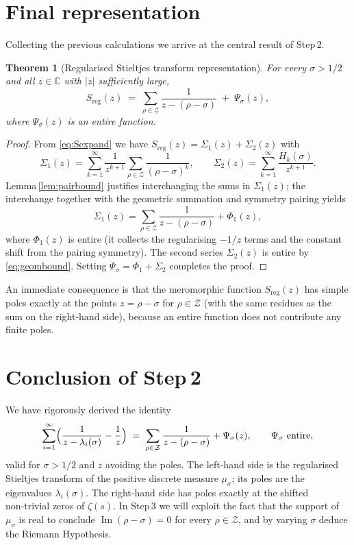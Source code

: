\documentclass[11pt,a4paper]{article}
\newtheorem{theorem}{Theorem}[section]
\theoremstyle{definition}
\newcommand{\C}{\mathbb{C}}
\newcommand{\Z}{\mathcal{Z}}
\newcommand{\IM}{\operatorname{Im}}
\begin{document}
\section{Final representation}
Collecting the previous calculations we arrive at the central result
of Step 2.

\begin{theorem}[Regularised Stieltjes transform representation]\label{thm:main}
For every \(\sigma > 1/2\) and all \(z \in \C\) with \(|z|\) sufficiently
large,
\[
S_{\mathrm{reg}}(z) \;=\; \sum_{\rho \in \Z} \frac{1}{z - (\rho-\sigma)}
\;+\; \Psi_\sigma(z),
\]
where \(\Psi_\sigma(z)\) is an entire function.
\end{theorem}

\begin{proof}
From \eqref{eq:Sexpand} we have
\(S_{\mathrm{reg}}(z) = \Sigma_1(z) + \Sigma_2(z)\) with
\[
\Sigma_1(z) = \sum_{k=1}^\infty \frac{1}{z^{k+1}}
\sum_{\rho \in \Z} \frac{1}{(\rho-\sigma)^k},
\qquad
\Sigma_2(z) = \sum_{k=1}^\infty \frac{H_k(\sigma)}{z^{k+1}} .
\]
Lemma \ref{lem:pairbound} justifies interchanging the sums in
\(\Sigma_1(z)\); the interchange together with the geometric summation
and symmetry pairing yields
\[
\Sigma_1(z) = \sum_{\rho \in \Z} \frac{1}{z-(\rho-\sigma)}
+ \Phi_1(z),
\]
where \(\Phi_1(z)\) is entire (it collects the regularising
\(-1/z\) terms and the constant shift from the pairing symmetry).
The second series \(\Sigma_2(z)\) is entire by
\eqref{eq:geombound}.  Setting \(\Psi_\sigma = \Phi_1 + \Sigma_2\)
completes the proof.
\end{proof}

An immediate consequence is that the meromorphic function
\(S_{\mathrm{reg}}(z)\) has simple poles exactly at the points
\(z = \rho-\sigma\) for \(\rho \in \Z\) (with the same residues as
the sum on the right‑hand side), because an entire function does not
contribute any finite poles.

\section*{Conclusion of Step 2}
We have rigorously derived the identity
\[
\sum_{i=1}^\infty \Bigl( \frac{1}{z - \lambda_i(\sigma)} - \frac{1}{z} \Bigr)
\;=\; \sum_{\rho \in \Z} \frac{1}{z - (\rho-\sigma)} + \Psi_\sigma(z),
\qquad \Psi_\sigma \text{ entire},
\]
valid for \(\sigma > 1/2\) and \(z\) avoiding the poles.
The left‑hand side is the regularised Stieltjes transform of the
positive discrete measure \(\mu_\sigma\); its poles are the eigenvalues
\(\lambda_i(\sigma)\).  The right‑hand side has poles exactly at the
shifted non‑trivial zeros of \(\zeta(s)\).
In Step 3 we will exploit the fact that the support of \(\mu_\sigma\)
is real to conclude \(\IM(\rho-\sigma)=0\) for every \(\rho\in\Z\), and
by varying \(\sigma\) deduce the Riemann Hypothesis.
\end{document}
